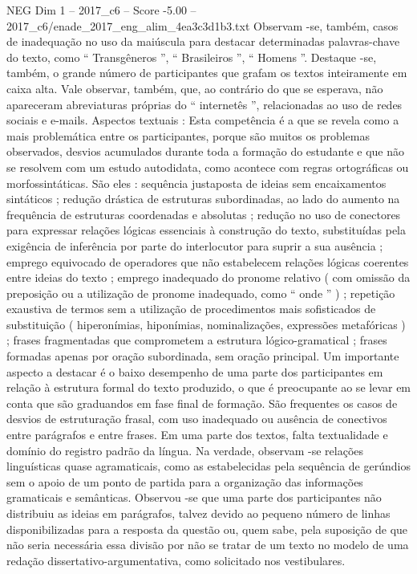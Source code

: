 \begin{textsample}{NEG Dim 1 – 2017\_c6 – Score -5.00 – 2017\_c6/enade\_2017\_eng\_alim\_4ea3c3d1b3.txt}
Observam -se, também, casos de inadequação no uso da maiúscula para destacar determinadas palavras-chave do texto, como “ Transgêneros ”, “ Brasileiros ”, “ Homens ”.
Destaque -se, também, o grande número de participantes que grafam os textos inteiramente em caixa alta.
Vale observar, também, que, ao contrário do que se esperava, não apareceram abreviaturas próprias do “ internetês ”, relacionadas ao uso de redes sociais e e-mails.
Aspectos textuais : Esta competência é a que se revela como a mais problemática entre os participantes, porque são muitos os problemas observados, desvios acumulados durante toda a formação do estudante e que não se resolvem com um estudo autodidata, como acontece com regras ortográficas ou morfossintáticas.
São eles : sequência justaposta de ideias sem encaixamentos sintáticos ; redução drástica de estruturas subordinadas, ao lado do aumento na frequência de estruturas coordenadas e absolutas ; redução no uso de conectores para expressar relações lógicas essenciais à construção do texto, substituídas pela exigência de inferência por parte do interlocutor para suprir a sua ausência ; emprego equivocado de operadores que não estabelecem relações lógicas coerentes entre ideias do texto ; emprego inadequado do pronome relativo ( com omissão da preposição ou a utilização de pronome inadequado, como “ onde ” ) ; repetição exaustiva de termos sem a utilização de procedimentos mais sofisticados de substituição ( hiperonímias, hiponímias, nominalizações, expressões metafóricas ) ; frases fragmentadas que comprometem a estrutura lógico-gramatical ; frases formadas apenas por oração subordinada, sem oração principal.
Um importante aspecto a destacar é o baixo desempenho de uma parte dos participantes em relação à estrutura formal do texto produzido, o que é preocupante ao se levar em conta que são graduandos em fase final de formação.
São frequentes os casos de desvios de estruturação frasal, com uso inadequado ou ausência de conectivos entre parágrafos e entre frases.
Em uma parte dos textos, falta textualidade e domínio do registro padrão da língua.
Na verdade, observam -se relações linguísticas quase agramaticais, como as estabelecidas pela sequência de gerúndios sem o apoio de um ponto de partida para a organização das informações gramaticais e semânticas.
Observou -se que uma parte dos participantes não distribuiu as ideias em parágrafos, talvez devido ao pequeno número de linhas disponibilizadas para a resposta da questão ou, quem sabe, pela suposição de que não seria necessária essa divisão por não se tratar de um texto no modelo de uma redação dissertativo-argumentativa, como solicitado nos vestibulares.

\end{textsample}
